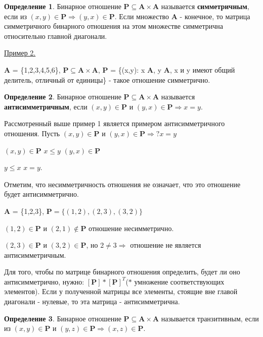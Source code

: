 \documentclass[12pt, a4paper, oneside]{article}
\theoremstyle{plain} %
\theoremstyle{definition}
\newtheorem*{definition}{Определение}  %
\newcommand{\indef}[1]{\textbf{ \color{dark_red} #1}}
\begin{document}
\begin{definition}
Бинарное отношение $\textbf{P} \subseteq \textbf{A} \times \textbf{A}$ называется \indef{симметричным}, если из $(x,y) \in \textbf{P} \Rightarrow (y,x) \in \textbf{P}$. Если множество \textbf{A} -  конечное, то матрица симметричного бинарного отношения на этом множестве симметрична относительно главной диагонали.
\end{definition}


\underline{Пример 2.}


\textbf{A} = \{1,2,3,4,5,6\}, $\textbf{P}\subseteq\textbf{A}\times\textbf{A}$, \textbf{P} = \{(x,y): x \in \textbf{A}, y \in \textbf{A}, \textrm{x и y имеют общий делитель, отличный от единицы}\} - такое отношение симметрично. 

\begin{definition}
Бинарное отношение $\textbf{P} \subseteq \textbf{A} \times \textbf{A}$ называется \indef{антисимметричным}, если $(x,y) \in \textbf{P}$ и $(y,x) \in \textbf{P} \Rightarrow x = y$. 
\end{definition}


Рассмотренный выше пример 1 является примером антисимметричного отношения. Пусть $(x,y) \in \textbf{P}$ и $(y,x) \in \textbf{P} \Rightarrow ? x = y$ 


$(x,y) \in \textbf{P}$ \Rightarrow $x \leq y$ $(y,x) \in \textbf{P}$


\Rightarrow $y \leq x$ \Rightarrow $x = y$. \par


Отметим, что несимметричность отношения не означает, что это отношение будет антисимметрично. 


\textbf{A} = \{1,2,3\}, $\textbf{P} = \{(1,2), (2,3), (3,2)\}$ 


$(1,2) \in \textbf{P}$ и $(2,1) \notin \textbf{P}$ \Rightarrow отношение несимметрично. 


$(2,3) \in \textbf{P}$ и $(3,2) \in \textbf{P}$, но $2 \neq 3 \Rightarrow$ отношение не является антисимметричным.\par 

Для того, чтобы по матрице бинарного отношения определить, будет ли оно антисимметрично, нужно: $[\textbf{P}]*[\textbf{P}]^T$($*$ умножение соответствующих элементов). Если у полученной матрицы все элементы, стоящие вне главой диагонали - нулевые, то эта матрица - антисимметрична. 

\begin{definition}
Бинарное отношение $\textbf{P} \subseteq \textbf{A} \times \textbf{A}$ называется транзитивным, если из $(x,y) \in \textbf{P}$ и $(y,z) \in \textbf{P} \Rightarrow (x,z) \in \textbf{P}$.
\end{definition}
\end{document}
